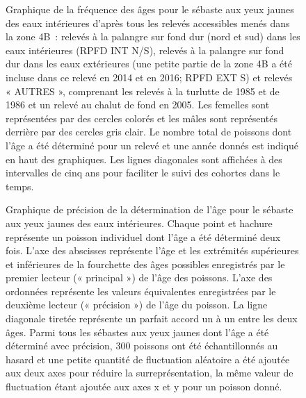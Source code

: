 \documentclass[11pt]{book}
\begin{document}
\begin{figure}[htb]

{\centering {} 

}

\caption{Graphique de la fréquence des âges pour le sébaste aux yeux jaunes des eaux intérieures d'après tous les relevés accessibles menés dans la zone 4B~: relevés à la palangre sur fond dur (nord et sud) dans les eaux intérieures (RPFD INT N/S), relevés à la palangre sur fond dur dans les eaux extérieures (une petite partie de la zone 4B a été incluse dans ce relevé en 2014 et en 2016; RPFD EXT S) et relevés « AUTRES », comprenant les relevés à la turlutte de 1985 et de 1986 et un relevé au chalut de fond en 2005. Les femelles sont représentées par des cercles colorés et les mâles sont représentés derrière par des cercles gris clair. Le nombre total de poissons dont l'âge a été déterminé pour un relevé et une année donnés est indiqué en haut des graphiques. Les lignes diagonales sont affichées à des intervalles de cinq ans pour faciliter le suivi des cohortes dans le temps.}\label{fig:age-freq}
\end{figure}

\begin{figure}[htb]

{\centering {} 

}

\caption{Graphique de précision de la détermination de l'âge pour le sébaste aux yeux jaunes des eaux intérieures. Chaque point et hachure représente un poisson individuel dont l'âge a été déterminé deux fois. L'axe des abscisses représente l'âge et les extrémités supérieures et inférieures de la fourchette des âges possibles enregistrés par le premier lecteur (« principal ») de l'âge des poissons. L'axe des ordonnées représente les valeurs équivalentes enregistrées par le deuxième lecteur (« précision ») de l'âge du poisson. La ligne diagonale tiretée représente un parfait accord un à un entre les deux âges. Parmi tous les sébastes aux yeux jaunes dont l'âge a été déterminé avec précision, 300 poissons ont été échantillonnés au hasard et une petite quantité de fluctuation aléatoire a été ajoutée aux deux axes pour réduire la surreprésentation, la même valeur de fluctuation étant ajoutée aux axes x et y pour un poisson donné.}\label{fig:age-precision}
\end{figure}
\end{document}
